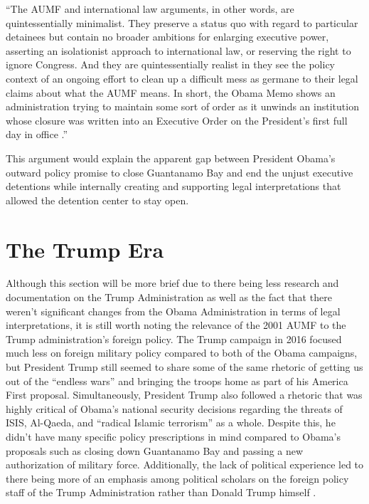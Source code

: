 \documentclass[12pt]{article}
\begin{document}
\begin{displayquote}
``The AUMF and international law arguments, in other words, are quintessentially minimalist. They preserve a status quo with regard to particular detainees but contain no broader ambitions for enlarging executive power, asserting an isolationist approach to international law, or reserving the right to ignore Congress. And they are quintessentially realist in they see the policy context of an ongoing effort to clean up a difficult mess as germane to their legal claims about what the AUMF means. In short, the Obama Memo shows an administration trying to maintain some sort of order as it unwinds an institution whose closure was written into an Executive Order on the President’s first full day in office \autocite[48]{brill2010}.''
\end{displayquote}

\noindent
This argument would explain the apparent gap between President Obama's outward policy promise to close Guantanamo Bay and end the unjust executive detentions while internally creating and supporting legal interpretations that allowed the detention center to stay open.

\section*{The Trump Era}
Although this section will be more brief due to there being less research and documentation on the Trump Administration as well as the fact that there weren't significant changes from the Obama Administration in terms of legal interpretations, it is still worth noting the relevance of the 2001 AUMF to the Trump administration's foreign policy.
The Trump campaign in 2016 focused much less on foreign military policy compared to both of the Obama campaigns, but President Trump still seemed to share some of the same rhetoric of getting us out of the ``endless wars'' and bringing the troops home as part of his America First proposal.
Simultaneously, President Trump also followed a rhetoric that was highly critical of Obama's national security decisions regarding the threats of ISIS, Al-Qaeda, and ``radical Islamic terrorism'' as a whole.
Despite this, he didn't have many specific policy prescriptions in mind compared to Obama's proposals such as closing down Guantanamo Bay and passing a new authorization of military force.
Additionally, the lack of political experience led to there being more of an emphasis among political scholars on the foreign policy staff of the Trump Administration rather than Donald Trump himself \autocite[24]{starr-deelen2018}.
\end{document}
